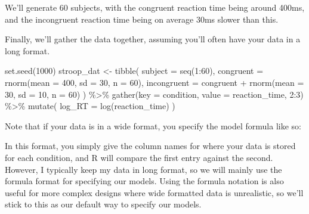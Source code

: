 \documentclass[
]{book}
\newenvironment{Shaded}{\begin{snugshade}}{\end{snugshade}}
\newcommand{\AttributeTok}[1]{\textcolor[rgb]{0.77,0.63,0.00}{#1}}
\newcommand{\ConstantTok}[1]{\textcolor[rgb]{0.00,0.00,0.00}{#1}}
\newcommand{\DecValTok}[1]{\textcolor[rgb]{0.00,0.00,0.81}{#1}}
\newcommand{\FunctionTok}[1]{\textcolor[rgb]{0.00,0.00,0.00}{#1}}
\newcommand{\NormalTok}[1]{#1}
\newcommand{\OtherTok}[1]{\textcolor[rgb]{0.56,0.35,0.01}{#1}}
\newcommand{\SpecialCharTok}[1]{\textcolor[rgb]{0.00,0.00,0.00}{#1}}
\begin{document}
We'll generate 60 subjects, with the congruent reaction time being around 400ms, and the incongruent reaction time being on average 30ms slower than this.

Finally, we'll gather the data together, assuming you'll often have your data in a long format.

\begin{Shaded}
\begin{Highlighting}[]
\FunctionTok{set.seed}\NormalTok{(}\DecValTok{1000}\NormalTok{)}
\NormalTok{stroop\_dat }\OtherTok{\textless{}{-}} \FunctionTok{tibble}\NormalTok{(}
  \AttributeTok{subject =} \FunctionTok{seq}\NormalTok{(}\DecValTok{1}\SpecialCharTok{:}\DecValTok{60}\NormalTok{),}
  \AttributeTok{congruent =} \FunctionTok{rnorm}\NormalTok{(}\AttributeTok{mean =} \DecValTok{400}\NormalTok{, }\AttributeTok{sd =} \DecValTok{30}\NormalTok{, }\AttributeTok{n =} \DecValTok{60}\NormalTok{),}
  \AttributeTok{incongruent =}\NormalTok{ congruent }\SpecialCharTok{+} \FunctionTok{rnorm}\NormalTok{(}\AttributeTok{mean =} \DecValTok{30}\NormalTok{, }\AttributeTok{sd =} \DecValTok{10}\NormalTok{, }\AttributeTok{n =} \DecValTok{60}\NormalTok{)}
\NormalTok{  ) }\SpecialCharTok{\%\textgreater{}\%}
  \FunctionTok{gather}\NormalTok{(}\AttributeTok{key =}\NormalTok{ condition, }\AttributeTok{value =}\NormalTok{ reaction\_time, }\DecValTok{2}\SpecialCharTok{:}\DecValTok{3}\NormalTok{) }\SpecialCharTok{\%\textgreater{}\%} 
  \FunctionTok{mutate}\NormalTok{(}
    \AttributeTok{log\_RT =} \FunctionTok{log}\NormalTok{(reaction\_time)}
\NormalTok{  )}
\end{Highlighting}
\end{Shaded}

Note that if your data is in a wide format, you specify the model formula like so:

\begin{Shaded}
\end{Shaded}

In this format, you simply give the column names for where your data is stored for each condition, and R will compare the first entry against the second. However, I typically keep my data in long format, so we will mainly use the formula format for specifying our models. Using the formula notation is also useful for more complex designs where wide formatted data is unrealistic, so we'll stick to this as our default way to specify our models.
\end{document}
